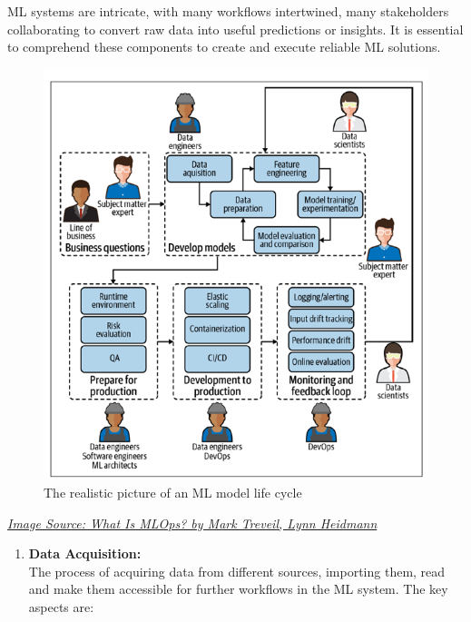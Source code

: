 \documentclass[
  letterpaper,
  DIV=11,
  numbers=noendperiod]{scrartcl}
\providecommand{\tightlist}{%
  \setlength{\itemsep}{0pt}\setlength{\parskip}{0pt}}\usepackage{longtable,booktabs,array}
\begin{document}
ML systems are intricate, with many workflows intertwined, many
stakeholders collaborating to convert raw data into useful predictions
or insights. It is essential to comprehend these components to create
and execute reliable ML solutions.

\begin{figure}[H]

{\centering \includegraphics{Introduction to MLOps_files/mediabag/Picture_2.png}

}

\caption{The realistic picture of an ML model life cycle}

\end{figure}%

\emph{\href{https://www.oreilly.com/library/view/what-is-mlops/9781492093626/ch01.html}{Image
Source: What Is MLOps? by Mark Treveil, Lynn Heidmann}}

\begin{enumerate}
\def\labelenumi{\arabic{enumi}.}
\tightlist
\item
  \textbf{Data Acquisition:}\\
  The process of acquiring data from different sources, importing them,
  read and make them accessible for further workflows in the ML system.
  The key aspects are:
\end{enumerate}
\end{document}
